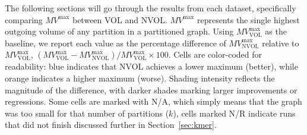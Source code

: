 The following sections will go through the results from each dataset, specifically comparing $MV^{\mathrm{max}}$ between VOL and NVOL. $MV^{\mathrm{max}}$ represents the single highest outgoing volume of any partition in a partitioned graph. Using $MV^{\mathrm{max}}_{\mathrm{VOL}}$ as the baseline, we report each value as the percentage difference of $MV^{\mathrm{max}}_{\mathrm{NVOL}}$ relative to $MV^{\mathrm{max}}_{\mathrm{VOL}}$, $(MV^{\mathrm{max}}_{\mathrm{VOL}} - MV^{\mathrm{max}}_{\mathrm{NVOL}}) / MV^{\mathrm{max}}_{\mathrm{VOL}} \times 100$. Cells are color-coded for readability: blue indicates that NVOL achieves a lower maximum (better), while orange indicates a higher maximum (worse). Shading intensity reflects the magnitude of the difference, with darker shades marking larger improvements or regressions. Some cells are marked with N/A, which simply means that the graph was too small for that number of partitions ($k$), cells marked N/R indicate runs that did not finish discussed further in Section~\ref{sec:kmer}.


